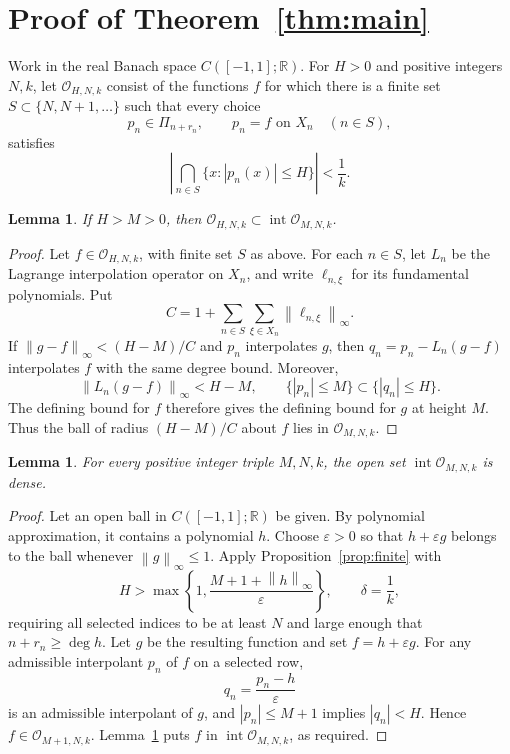\documentclass[11pt]{article}
\newtheorem{lemma}[theorem]{Lemma}
\theoremstyle{definition}
\numberwithin{equation}{section}
\newcommand{\R}{\mathbb R}
\newcommand{\norm}[1]{\left\lVert #1\right\rVert}
\begin{document}
\section{Proof of Theorem~\ref{thm:main}}\label{sec:baire}

Work in the real Banach space \(C([-1,1];\R)\).
For \(H>0\) and positive integers \(N,k\), let \(\mathcal O_{H,N,k}\)
consist of the functions \(f\) for which there is a finite set
\(S\subset\{N,N+1,\ldots\}\) such that every choice
\[
 p_n\in\Pi_{n+r_n},\qquad p_n=f\text{ on }X_n\quad(n\in S),
\]
satisfies
\[
 \left|\bigcap_{n\in S}\{x:|p_n(x)|\le H\}\right|<\frac1k.
\]

\begin{lemma}\label{lem:stability}
If \(H>M>0\), then
\(\mathcal O_{H,N,k}\subset\operatorname{int}\mathcal O_{M,N,k}\).
\end{lemma}

\begin{proof}
Let \(f\in\mathcal O_{H,N,k}\), with finite set \(S\) as above.
For each \(n\in S\), let \(L_n\) be the Lagrange interpolation
operator on \(X_n\), and write \(\ell_{n,\xi}\) for its fundamental
polynomials. Put
\[
 C=1+\sum_{n\in S}\sum_{\xi\in X_n}\norm{\ell_{n,\xi}}_\infty.
\]
If \(\norm{g-f}_\infty<(H-M)/C\) and \(p_n\) interpolates \(g\),
then \(q_n=p_n-L_n(g-f)\) interpolates \(f\) with the same degree
bound. Moreover,
\[
 \norm{L_n(g-f)}_\infty<H-M,
 \qquad
 \{|p_n|\le M\}\subset\{|q_n|\le H\}.
\]
The defining bound for \(f\) therefore gives the defining bound for
\(g\) at height \(M\). Thus the ball of radius \((H-M)/C\) about
\(f\) lies in \(\mathcal O_{M,N,k}\).
\end{proof}

\begin{lemma}\label{lem:dense-open}
For every positive integer triple \(M,N,k\), the open set
\(\operatorname{int}\mathcal O_{M,N,k}\) is dense.
\end{lemma}

\begin{proof}
Let an open ball in \(C([-1,1];\R)\) be given.
By polynomial approximation, it contains a polynomial \(h\).
Choose \(\varepsilon>0\) so that \(h+\varepsilon g\) belongs to
the ball whenever \(\norm{g}_\infty\le1\).
Apply Proposition~\ref{prop:finite} with
\[
 H>\max\left\{1,\frac{M+1+\norm{h}_\infty}{\varepsilon}\right\},
 \qquad \delta=\frac1k,
\]
requiring all selected indices to be at least \(N\) and large enough
that \(n+r_n\ge\deg h\).
Let \(g\) be the resulting function and set \(f=h+\varepsilon g\).
For any admissible interpolant \(p_n\) of \(f\) on a selected row,
\[
 q_n=\frac{p_n-h}{\varepsilon}
\]
is an admissible interpolant of \(g\), and \(|p_n|\le M+1\)
implies \(|q_n|<H\). Hence \(f\in\mathcal O_{M+1,N,k}\).
Lemma~\ref{lem:stability} puts \(f\) in
\(\operatorname{int}\mathcal O_{M,N,k}\), as required.
\end{proof}
\end{document}

